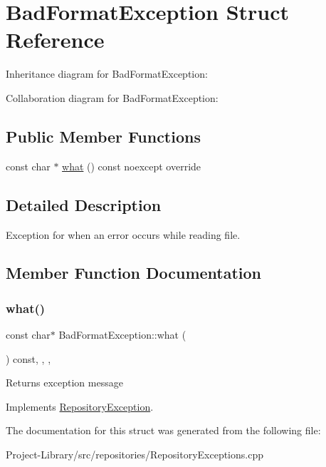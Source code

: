 \hypertarget{structBadFormatException}{}\section{Bad\+Format\+Exception Struct Reference}
\label{structBadFormatException}


Inheritance diagram for Bad\+Format\+Exception\+:


Collaboration diagram for Bad\+Format\+Exception\+:
\subsection*{Public Member Functions}
\begin{DoxyCompactItemize}
\item 
const char $\ast$ \hyperlink{structBadFormatException_a53a1092ba48db2a0040f50ba4ba3a379}{what} () const noexcept override
\end{DoxyCompactItemize}


\subsection{Detailed Description}
Exception for when an error occurs while reading file. 

\subsection{Member Function Documentation}
\mbox{\label{structBadFormatException_a53a1092ba48db2a0040f50ba4ba3a379}} 
\subsubsection{\texorpdfstring{what()}{what()}}
{\footnotesize\ttfamily const char$\ast$ Bad\+Format\+Exception\+::what (\begin{DoxyParamCaption}{ }\end{DoxyParamCaption}) const\hspace{0.3cm}{\ttfamily [inline]}, {\ttfamily [override]}, {\ttfamily [virtual]}, {\ttfamily [noexcept]}}

Returns exception message 

Implements \hyperlink{structRepositoryException_a6fdc5fe8fe6abdd205402d8648e5ccd4}{Repository\+Exception}.



The documentation for this struct was generated from the following file\+:\begin{DoxyCompactItemize}
\item 
Project-\/\+Library/src/repositories/Repository\+Exceptions.\+cpp\end{DoxyCompactItemize}
